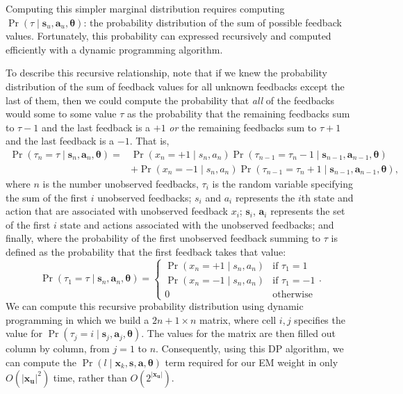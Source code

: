 \documentclass{article}
\begin{document}
Computing this simpler marginal distribution requires computing $\Pr(\tau \mid \bm{s}_u, \bm{a}_u, \bm{\theta})$: the probability distribution of the sum of possible feedback values. Fortunately, this probability can expressed recursively and computed efficiently with a dynamic programming algorithm. 

To describe this recursive relationship, note that if we knew the probability distribution of the sum of feedback values for all unknown feedbacks except the last of them, then we could compute the probability that {\em all} of the feedbacks would some to some value $\tau$ as the probability that the remaining feedbacks sum to $\tau - 1$ and the last feedback is a $+1$ {\em or} the remaining feedbacks sum to $\tau + 1$ and the last feedback is a $-1$. That is,
\begin{align}
\Pr(\tau_n = \tau \mid \bm{s}_n, \bm{a}_n, \bm{\theta}) =& \Pr(x_n = +1 \mid s_n, a_n) \Pr(\tau_{n-1} = \tau_n - 1 \mid \bm{s}_{n-1}, \bm{a}_{n-1}, \bm{\theta}) \nonumber \\
& + \Pr(x_n = -1 \mid s_n, a_n) \Pr(\tau_{n-1} = \tau_n + 1 \mid \bm{s}_{n-1}, \bm{a}_{n-1}, \bm{\theta}), 
\end{align}
where $n$ is the number unobserved feedbacks, $\tau_i$ is the random variable specifying the sum of the first $i$ unobserved feedbacks; $s_i$ and $a_i$ represents the $i$th state and action that are associated with unobserved feedback $x_i$; $\bm{s}_i$, $\bm{a}_i$ represents the set of the first $i$ state and actions associated with the unobserved feedbacks; and finally, where the probability of the first unobserved feedback summing to $\tau$ is defined as the probability that the first feedback takes that value:
\begin{equation}
\Pr(\tau_1 = \tau \mid \bm{s}_n, \bm{a}_n, \bm{\theta}) = \begin{cases}
\Pr(x_n = +1 \mid s_n, a_n) & \mbox{if } \tau_1 = 1 \\
\Pr(x_n = -1 \mid s_n, a_n) & \mbox{if } \tau_1 = -1 \\
0 & \mbox{otherwise}
\end{cases}.
\end{equation}
We can compute this recursive probability distribution using dynamic programming in which we build a $2n+1 \times n$ matrix, where cell $i,j$ specifies the value for $\Pr(\tau_j = i \mid \bm{s}_j, \bm{a}_j, \bm{\theta})$. The values for the matrix are then filled out column by column, from $j=1$ to $n$. Consequently, using this DP algorithm, we can compute the $\Pr(l \mid \bm{x}_k, \bm{s}, \bm{a}, \bm{\theta})$ term required for our EM weight in only $O(|\bm{x_u}|^2)$ time, rather than $O(2^{|\bm{x_u}|})$.
\end{document}
